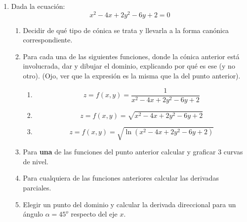 \documentclass[12pt]{article}
\theoremstyle{definition}
\begin{document}
\begin{enumerate}

\item  
Dada la ecuación:
\begin{equation*}
x^2- 4x+2y^2-6y+2=0
\end{equation*} 
\begin{enumerate}
\item  Decidir de qué tipo de cónica se trata y llevarla a la forma canónica correspondiente.
\item  Para cada una de las siguientes funciones, donde la cónica anterior está involucrada, dar y dibujar el dominio, explicando por qué es ese (y no otro). (Ojo, ver que la expresión es la misma que la del punto anterior).
\begin{enumerate}
\item  
\begin{equation*}
z = f(x,y) = \frac{1}{x^2- 4x+2y^2-6y+2}
\end{equation*}
\item  
\begin{equation*}
z = f(x,y) = \sqrt{x^2- 4x+2y^2-6y+2}
\end{equation*}
\item  
\begin{equation*}
z = f(x,y) =\sqrt{\ln{(x^2- 4x+2y^2-6y+2)}}
\end{equation*}
\end{enumerate}
\item Para \textbf{una} de las funciones del punto anterior calcular y graficar 3 curvas de nivel.
\item Para cualquiera de las funciones anteriores calcular las derivadas parciales.
\item Elegir un punto del dominio y calcular la derivada direccional para un ángulo $\alpha=45^o$ respecto del eje $x$.
\end{enumerate}


\end{enumerate}
\end{document}
